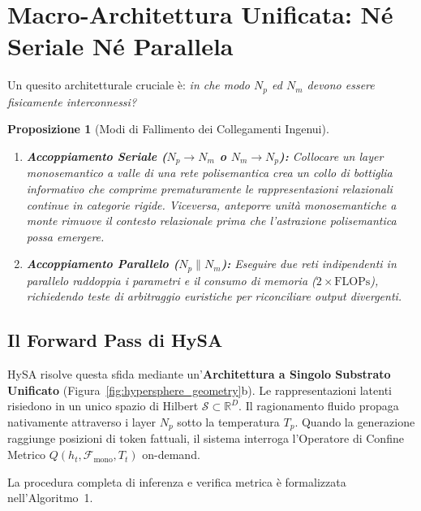 \documentclass[11pt,a4paper]{article}
\newtheorem{proposizione}{Proposizione}
\theoremstyle{definition}
\begin{document}
\section{Macro-Architettura Unificata: Né Seriale Né Parallela}

Un quesito architetturale cruciale è: \textit{in che modo $N_p$ ed $N_m$ devono essere fisicamente interconnessi?}

\begin{proposizione}[Modi di Fallimento dei Collegamenti Ingenui]
\leavevmode
\begin{enumerate}[leftmargin=*, itemsep=2.5pt]
    \item \textbf{Accoppiamento Seriale ($N_p \to N_m$ o $N_m \to N_p$):} Collocare un layer monosemantico a valle di una rete polisemantica crea un collo di bottiglia informativo che comprime prematuramente le rappresentazioni relazionali continue in categorie rigide. Viceversa, anteporre unità monosemantiche a monte rimuove il contesto relazionale prima che l'astrazione polisemantica possa emergere.
    \item \textbf{Accoppiamento Parallelo ($N_p \parallel N_m$):} Eseguire due reti indipendenti in parallelo raddoppia i parametri e il consumo di memoria ($2\times \mathrm{FLOPs}$), richiedendo teste di arbitraggio euristiche per riconciliare output divergenti.
\end{enumerate}
\end{proposizione}

\subsection{Il Forward Pass di HySA}
HySA risolve questa sfida mediante un'\textbf{Architettura a Singolo Substrato Unificato} (Figura~\ref{fig:hypersphere_geometry}b). Le rappresentazioni latenti risiedono in un unico spazio di Hilbert $\mathcal{S} \subset \mathbb{R}^D$. Il ragionamento fluido propaga nativamente attraverso i layer $N_p$ sotto la temperatura $T_p$. Quando la generazione raggiunge posizioni di token fattuali, il sistema interroga l'Operatore di Confine Metrico $Q(h_t, \mathcal{F}_{\mathrm{mono}}, T_t)$ on-demand.

La procedura completa di inferenza e verifica metrica è formalizzata nell'Algoritmo~1.
\end{document}
